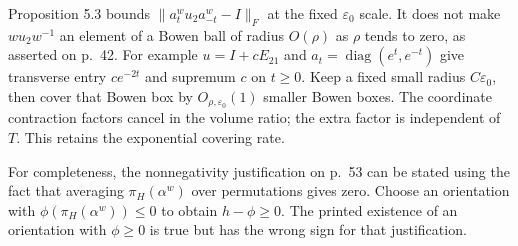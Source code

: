 \documentclass[10pt]{article}
\begin{document}
Proposition 5.3 bounds \(\|a_t^w u_2a_{-t}^w-I\|_F\) at the fixed \(\varepsilon_0\) scale. It does not make \(wu_2w^{-1}\) an element of a Bowen ball of radius \(O(\rho)\) as \(\rho\) tends to zero, as asserted on p. 42. For example \(u=I+cE_{21}\) and \(a_t=\operatorname{diag}(e^t,e^{-t})\) give transverse entry \(ce^{-2t}\) and supremum \(c\) on \(t\ge0\). Keep a fixed small radius \(C\varepsilon_0\), then cover that Bowen box by \(O_{\rho,\varepsilon_0}(1)\) smaller Bowen boxes. The coordinate contraction factors cancel in the volume ratio; the extra factor is independent of \(T\). This retains the exponential covering rate.\par
For completeness, the nonnegativity justification on p. 53 can be stated using the fact that averaging \(\pi_H(\alpha^w)\) over permutations gives zero. Choose an orientation with \(\phi(\pi_H(\alpha^w))\le0\) to obtain \(h-\phi\ge0\). The printed existence of an orientation with \(\phi\ge0\) is true but has the wrong sign for that justification.\par
\end{document}
